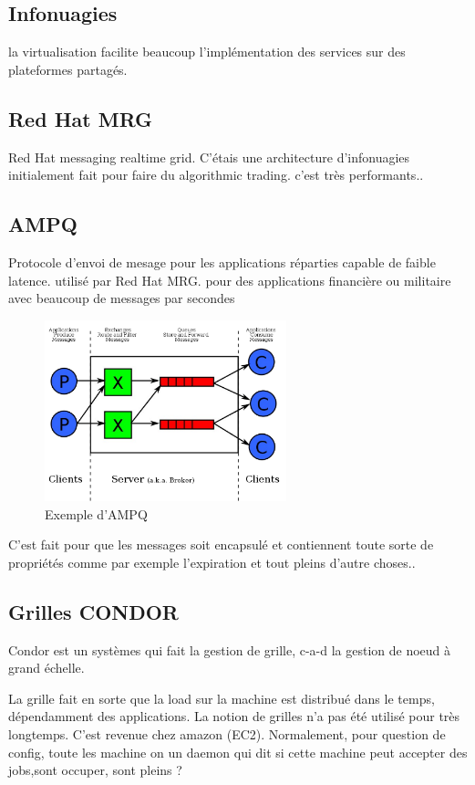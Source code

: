 \documentclass[oneside]{book}
\begin{document}
\subsection{Infonuagies}
la virtualisation facilite beaucoup l'implémentation des services sur des plateformes partagés.\\

\subsection{Red Hat MRG}
Red Hat messaging realtime grid. C'étais une architecture d'infonuagies initialement fait pour faire du algorithmic trading. c'est très performants..\\

\subsection{AMPQ}
Protocole d'envoi de mesage pour les applications réparties capable de faible latence. utilisé par Red Hat MRG. pour des applications financière ou militaire avec beaucoup de messages par secondes\\

\begin{figure}[!ht]
\centering
\includegraphics[width = 7cm]{18.png}
\caption{Exemple d'AMPQ}
\end{figure}

C'est fait pour que les messages soit encapsulé et contiennent toute sorte de propriétés comme par exemple l'expiration et tout pleins d'autre choses.. \\


\subsection{Grilles CONDOR}
Condor est un systèmes qui fait la gestion de grille, c-a-d la gestion de noeud à grand échelle.

La grille fait en sorte que la load sur la machine est distribué dans le temps, dépendamment des applications. La notion de grilles n'a pas été utilisé pour très longtemps. C'est revenue chez amazon (EC2). Normalement, pour question de config, toute les machine on un daemon qui dit si cette machine peut accepter des jobs,sont occuper, sont pleins ?\\
\end{document}
